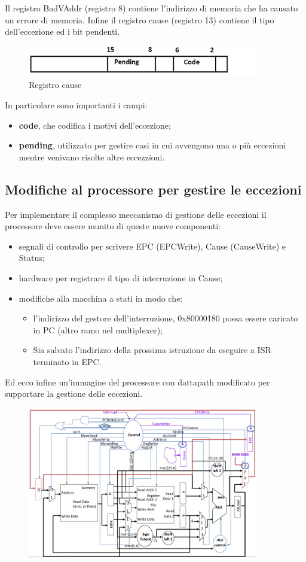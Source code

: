 \documentclass[class=book, crop=false, oneside]{standalone}
\begin{document}
Il registro BadVAddr (registro 8) contiene l'indirizzo di memoria che ha causato un errore di memoria.
Infine il registro cause (registro 13) contiene il tipo dell’eccezione ed i bit pendenti.

\begin{figure}[!h]
	\centering
	\includegraphics[width=0.9\textwidth,keepaspectratio]{registro-cause}
	\caption{Registro cause}
\end{figure}

In particolare sono importanti i campi:
\begin{itemize}
	\item \textbf{code}, che codifica i motivi dell'eccezione;
	\item \textbf{pending}, utilizzato per gestire casi in cui avvengono una o più eccezioni mentre venivano risolte altre eccezzioni.
\end{itemize}

\subsection{Modifiche al processore per gestire le eccezioni}
Per implementare il complesso meccanismo di gestione delle eccezioni il processore deve essere munito di queste nuove componenti:
\begin{itemize}
	\item segnali di controllo per scrivere EPC (EPCWrite), Cause (CauseWrite) e Status;
	\item hardware per registrare il tipo di interruzione in Cause;
	\item modifiche alla macchina a stati in modo che:
	\begin{itemize}
		\item l’indirizzo del gestore dell’interruzione, 0x80000180  possa essere caricato in PC (altro ramo nel multiplexer);
		\item Sia salvato l’indirizzo della prossima istruzione da eseguire a ISR terminato in EPC.
	\end{itemize}
\end{itemize}

Ed ecco infine un'immagine del processore con dattapath modificato per supportare la gestione delle eccezioni.

\begin{figure}[!h]
	\centering
	\includegraphics[width=0.9\textwidth,keepaspectratio]{final-datapath}
\end{figure}
\end{document}

